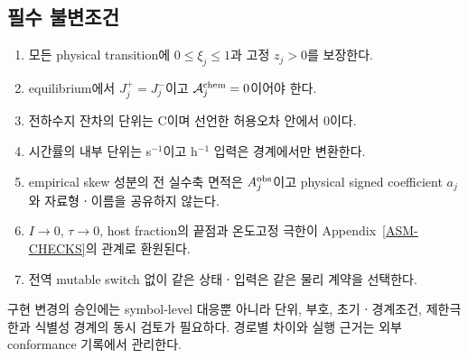 \subsection{필수 불변조건}

\begin{enumerate}[label=\textsf{I\arabic*.},leftmargin=3.2em]
\item 모든 physical transition에 $0\le\xi_j\le1$과 고정 $z_j>0$를
보장한다.
\item equilibrium에서 $J_j^+=J_j^-$이고
$\mathcal A_j^{\mathrm{chem}}=0$이어야 한다.
\item 전하수지 잔차의 단위는 C이며 선언한 허용오차 안에서 0이다.
\item 시간률의 내부 단위는 s$^{-1}$이고 h$^{-1}$ 입력은 경계에서만
변환한다.
\item empirical skew 성분의 전 실수축 면적은 $A_j^{\mathrm{obs}}$이고
physical signed coefficient $a_j$와 자료형ㆍ이름을 공유하지 않는다.
\item $I\to0$, $\tau\to0$, host fraction의 끝점과 온도고정 극한이
Appendix~\ref{ASM-CHECKS}의 관계로 환원된다.
\item 전역 mutable switch 없이 같은 상태ㆍ입력은 같은 물리
계약을 선택한다.
\end{enumerate}

\begin{openitem}
구현 변경의 승인에는 symbol-level 대응뿐 아니라 단위, 부호,
초기ㆍ경계조건, 제한극한과 식별성 경계의 동시 검토가 필요하다.
경로별 차이와 실행 근거는 외부 conformance 기록에서 관리한다.
\end{openitem}

